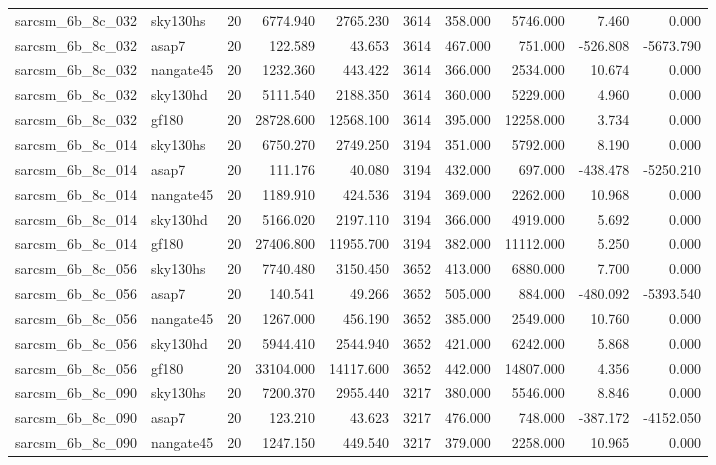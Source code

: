 \documentclass{article}
\begin{document}
\begin{longtable}{llrrrrrrrr}
sarcsm\_6b\_8c\_032 & sky130hs & 20 & 6774.940 & 2765.230 & 3614 & 358.000 & 5746.000 & 7.460 & 0.000 \\
sarcsm\_6b\_8c\_032 & asap7 & 20 & 122.589 & 43.653 & 3614 & 467.000 & 751.000 & -526.808 & -5673.790 \\
sarcsm\_6b\_8c\_032 & nangate45 & 20 & 1232.360 & 443.422 & 3614 & 366.000 & 2534.000 & 10.674 & 0.000 \\
sarcsm\_6b\_8c\_032 & sky130hd & 20 & 5111.540 & 2188.350 & 3614 & 360.000 & 5229.000 & 4.960 & 0.000 \\
sarcsm\_6b\_8c\_032 & gf180 & 20 & 28728.600 & 12568.100 & 3614 & 395.000 & 12258.000 & 3.734 & 0.000 \\
sarcsm\_6b\_8c\_014 & sky130hs & 20 & 6750.270 & 2749.250 & 3194 & 351.000 & 5792.000 & 8.190 & 0.000 \\
sarcsm\_6b\_8c\_014 & asap7 & 20 & 111.176 & 40.080 & 3194 & 432.000 & 697.000 & -438.478 & -5250.210 \\
sarcsm\_6b\_8c\_014 & nangate45 & 20 & 1189.910 & 424.536 & 3194 & 369.000 & 2262.000 & 10.968 & 0.000 \\
sarcsm\_6b\_8c\_014 & sky130hd & 20 & 5166.020 & 2197.110 & 3194 & 366.000 & 4919.000 & 5.692 & 0.000 \\
sarcsm\_6b\_8c\_014 & gf180 & 20 & 27406.800 & 11955.700 & 3194 & 382.000 & 11112.000 & 5.250 & 0.000 \\
sarcsm\_6b\_8c\_056 & sky130hs & 20 & 7740.480 & 3150.450 & 3652 & 413.000 & 6880.000 & 7.700 & 0.000 \\
sarcsm\_6b\_8c\_056 & asap7 & 20 & 140.541 & 49.266 & 3652 & 505.000 & 884.000 & -480.092 & -5393.540 \\
sarcsm\_6b\_8c\_056 & nangate45 & 20 & 1267.000 & 456.190 & 3652 & 385.000 & 2549.000 & 10.760 & 0.000 \\
sarcsm\_6b\_8c\_056 & sky130hd & 20 & 5944.410 & 2544.940 & 3652 & 421.000 & 6242.000 & 5.868 & 0.000 \\
sarcsm\_6b\_8c\_056 & gf180 & 20 & 33104.000 & 14117.600 & 3652 & 442.000 & 14807.000 & 4.356 & 0.000 \\
sarcsm\_6b\_8c\_090 & sky130hs & 20 & 7200.370 & 2955.440 & 3217 & 380.000 & 5546.000 & 8.846 & 0.000 \\
sarcsm\_6b\_8c\_090 & asap7 & 20 & 123.210 & 43.623 & 3217 & 476.000 & 748.000 & -387.172 & -4152.050 \\
sarcsm\_6b\_8c\_090 & nangate45 & 20 & 1247.150 & 449.540 & 3217 & 379.000 & 2258.000 & 10.965 & 0.000 \\

\end{longtable}
\end{document}
